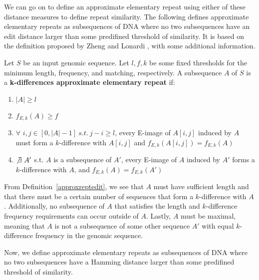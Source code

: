 We can go on to define an approximate elementary repeat using either of these distance measures to define repeat similarity. The following defines approximate elementary repeats as subsequences of DNA where no two subsequences have an edit distance larger than some predifined threshold of similarity. It is based on the definition proposed by Zheng and Lonardi \cite{zheng2005discovery}, with some additional information.

\begin{defn}
Let $S$ be an input genomic sequence. Let $l, f, k$ be some fixed thresholds for the minimum length, frequency, and matching, respectively. A subsequence $A$ of $S$ is a \textbf{k-differences approximate elementary repeat} if:
\begin{enumerate}
\item{$|A| \geq l$} %
\item{$f_{E,k}(A) \geq f$}
\item{$\forall$ $i, j \in [0,|A|-1] \ s.t. \ j-i \geq l$, every E-image of $A[i,j]$ induced by $A$ must form a $k$-difference with $A[i,j]$ and $f_{E,k}(A[i,j]) = f_{E,k}(A)$}
\item{$\not\exists \ A'$  s.t. $A$ is a subsequence of $A'$, every E-image of $A$ induced by $A'$ forms a $k$-difference with $A$, and $f_{E,k}(A) = f_{E,k}(A')$}
\end{enumerate}
\label{approxreptedit}
\end{defn}

From Definition~\ref{approxreptedit}, we see that $A$ must have sufficient length and that there must be a certain number of sequences that form a $k$-difference with $A$. Additionally, no subsequence of $A$ that satisfies the length and $k$-difference frequency requirements can occur outside of $A$. Lastly, $A$ must be maximal, meaning that $A$ is not a subsequence of some other sequence $A'$ with equal $k$-difference frequency in the genomic sequence.


Now, we define approximate elementary repeats as subsequences of DNA where no two subsequences have a Hamming distance larger than some predifined threshold of similarity. 

